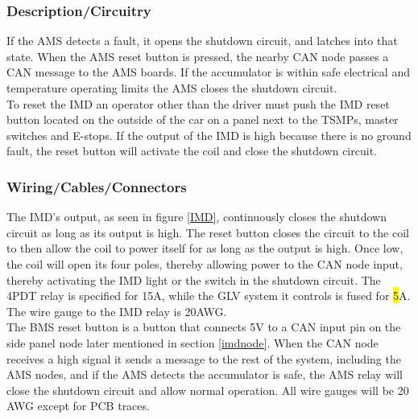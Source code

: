 \documentclass{article}
\DeclareRobustCommand{\hlr}[1]{{\sethlcolor{red}\hl{#1}}}
\begin{document}
        \subsubsection{Description/Circuitry}


            If the AMS detects a fault, it opens the shutdown circuit, and latches into that state. When the AMS reset button is pressed, the nearby CAN node passes a CAN message to the AMS boards. If the accumulator is within safe electrical and temperature operating limits the AMS closes the shutdown circuit.\\

           To reset the IMD an operator other than the driver must push the IMD reset button located on the outside of the car on a panel next to the TSMPs, master switches and E-stops. If the output of the IMD is high because there is no ground fault, the reset button will activate the coil and close the shutdown circuit.

        \subsubsection{Wiring/Cables/Connectors}

            The IMD's output, as seen in figure \ref{IMD}, continuously closes the shutdown circuit as long as its output is high. The reset button closes the circuit to the coil to then allow the coil to power itself for as long as the output is high. Once low, the coil will open its four poles, thereby allowing power to the CAN node input, thereby activating the IMD light or the switch in the shutdown circuit. The 4PDT relay is specified for 15A, while the GLV system it controls is fused for \hlr{5}A. The wire gauge to the IMD relay is 20AWG.\\

            The BMS reset button is a button that connects 5V to a CAN input pin on the side panel node later mentioned in section \ref{imdnode}. When the CAN node receives a high signal it sends a message to the rest of the system, including the AMS nodes, and if the AMS detects the accumulator is safe, the AMS relay will close the shutdown circuit and allow normal operation. All wire gauges will be 20 AWG except for PCB traces. \\
\end{document}
